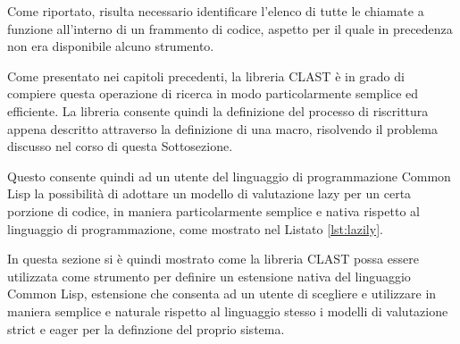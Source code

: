 Come riportato, risulta necessario identificare l'elenco di tutte le chiamate a funzione all'interno di un frammento di codice, aspetto per il quale in precedenza non era disponibile alcuno strumento.

Come presentato nei capitoli precedenti, la libreria CLAST è in grado di compiere questa operazione di ricerca in modo particolarmente semplice ed efficiente. La libreria consente quindi la definizione del processo di riscrittura appena descritto attraverso la definizione di una macro, risolvendo il problema discusso nel corso di questa Sottosezione.

Questo consente quindi ad un utente del linguaggio di programmazione Common Lisp la possibilità di adottare un modello di valutazione lazy per un certa porzione di codice, in maniera particolarmente semplice e nativa rispetto al linguaggio di programmazione, come mostrato nel Listato \ref{lst:lazily}.

In questa sezione si è quindi mostrato come la libreria CLAST possa essere utilizzata come strumento per definire un estensione nativa del linguaggio Common Lisp, estensione che consenta ad un utente di scegliere e utilizzare in maniera semplice e naturale rispetto al linguaggio stesso i modelli di valutazione strict e eager per la definzione del proprio sistema.
